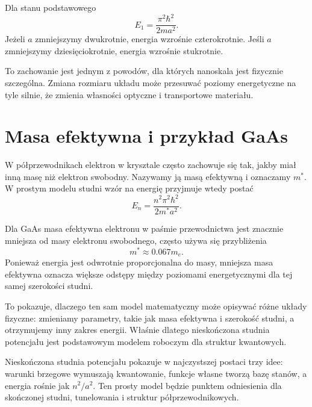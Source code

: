 Dla stanu podstawowego
\begin{equation}
E_1=\frac{\pi^2\hbar^2}{2ma^2}.
\end{equation}
Jeżeli \(a\) zmniejszymy dwukrotnie, energia wzrośnie czterokrotnie. Jeśli \(a\) zmniejszymy dziesięciokrotnie, energia wzrośnie stukrotnie.

To zachowanie jest jednym z powodów, dla których nanoskala jest fizycznie szczególna. Zmiana rozmiaru układu może przesuwać poziomy energetyczne na tyle silnie, że zmienia własności optyczne i transportowe materiału.

\section{Masa efektywna i przykład GaAs}

W półprzewodnikach elektron w krysztale często zachowuje się tak, jakby miał inną masę niż elektron swobodny. Nazywamy ją masą efektywną i oznaczamy \(m^*\). W prostym modelu studni wzór na energię przyjmuje wtedy postać
\begin{equation}
E_n=\frac{n^2\pi^2\hbar^2}{2m^*a^2}.
\end{equation}

Dla GaAs masa efektywna elektronu w paśmie przewodnictwa jest znacznie mniejsza od masy elektronu swobodnego, często używa się przybliżenia
\[
m^*\approx 0.067m_e.
\]
Ponieważ energia jest odwrotnie proporcjonalna do masy, mniejsza masa efektywna oznacza większe odstępy między poziomami energetycznymi dla tej samej szerokości studni.

To pokazuje, dlaczego ten sam model matematyczny może opisywać różne układy fizyczne: zmieniamy parametry, takie jak masa efektywna i szerokość studni, a otrzymujemy inny zakres energii. Właśnie dlatego nieskończona studnia potencjału jest podstawowym modelem roboczym dla struktur kwantowych.

\begin{summarybox}
Nieskończona studnia potencjału pokazuje w najczystszej postaci trzy idee: warunki brzegowe wymuszają kwantowanie, funkcje własne tworzą bazę stanów, a energia rośnie jak \(n^2/a^2\). Ten prosty model będzie punktem odniesienia dla skończonej studni, tunelowania i struktur półprzewodnikowych.
\end{summarybox}
